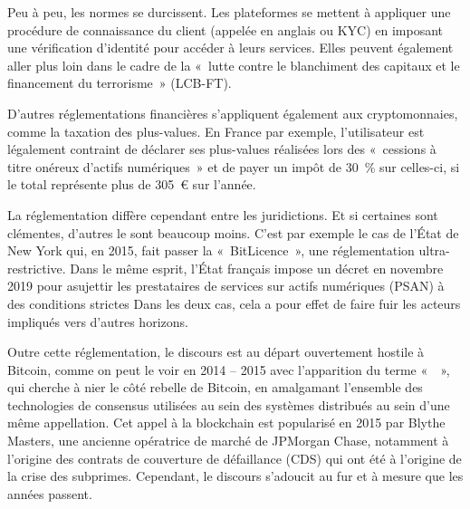 Peu à peu, les normes se durcissent. Les plateformes se mettent à appliquer une procédure de connaissance du client (appelée en anglais  ou KYC) en imposant une vérification d'identité pour accéder à leurs services. Elles peuvent également aller plus loin dans le cadre de la «~lutte contre le blanchiment des capitaux et le financement du terrorisme~» (LCB-FT).

D'autres réglementations financières s'appliquent également aux cryptomonnaies, comme la taxation des plus-values. En France par exemple, l'utilisateur est légalement contraint de déclarer ses plus-values réalisées lors des «~cessions à titre onéreux d'actifs numériques~» et de payer un impôt de 30~\% sur celles-ci, si le total représente plus de 305~€ sur l'année.

La réglementation diffère cependant entre les juridictions. Et si certaines sont clémentes, d'autres le sont beaucoup moins. C'est par exemple le cas de l'État de New York qui, en 2015, fait passer la «~BitLicence~», une réglementation ultra-restrictive. Dans le même esprit, l'État français impose un décret en novembre 2019 pour asujettir les prestataires de services sur actifs numériques (PSAN) à des conditions strictes Dans les deux cas, cela a pour effet de faire fuir les acteurs impliqués vers d'autres horizons.

Outre cette réglementation, le discours est au départ ouvertement hostile à Bitcoin, comme on peut le voir en 2014 -- 2015 avec l'apparition du terme «~~», qui cherche à nier le côté rebelle de Bitcoin, en amalgamant l'ensemble des technologies de consensus utilisées au sein des systèmes distribués au sein d'une même appellation. Cet appel à la blockchain est popularisé en 2015 par Blythe Masters, une ancienne opératrice de marché de JPMorgan Chase, notamment à l'origine des contrats de couverture de défaillance (CDS) qui ont été à l'origine de la crise des subprimes. Cependant, le discours s'adoucit au fur et à mesure que les années passent. %

